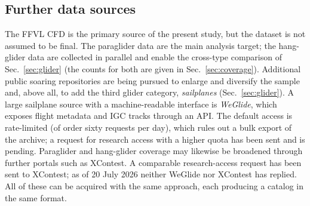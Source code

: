 \subsection{Further data sources}
The FFVL CFD is the primary source of the present study, but the dataset is not assumed to
be final. The paraglider data are the main analysis target; the hang-glider data are
collected in parallel and enable the cross-type comparison of Sec.~\ref{sec:glider}
(the counts for both are given in Sec.~\ref{sec:coverage}). Additional
public soaring repositories are
being pursued to enlarge and diversify the sample and, above all, to add the third glider
category, \emph{sailplanes} (Sec.~\ref{sec:glider}). A large sailplane source with a
machine-readable interface is \emph{WeGlide}, which exposes flight metadata and IGC tracks
through an API. The
default access is rate-limited (of order sixty requests per day), which rules out a bulk
export of the archive; a request for research access with a higher quota has been sent
and is pending. Paraglider and hang-glider coverage may likewise be broadened through
further portals such as XContest. A comparable research-access request has been sent
to XContest; as of 20 July 2026 neither WeGlide nor XContest has replied. All of these can
be acquired with the same approach, each producing a catalog in the same format.
